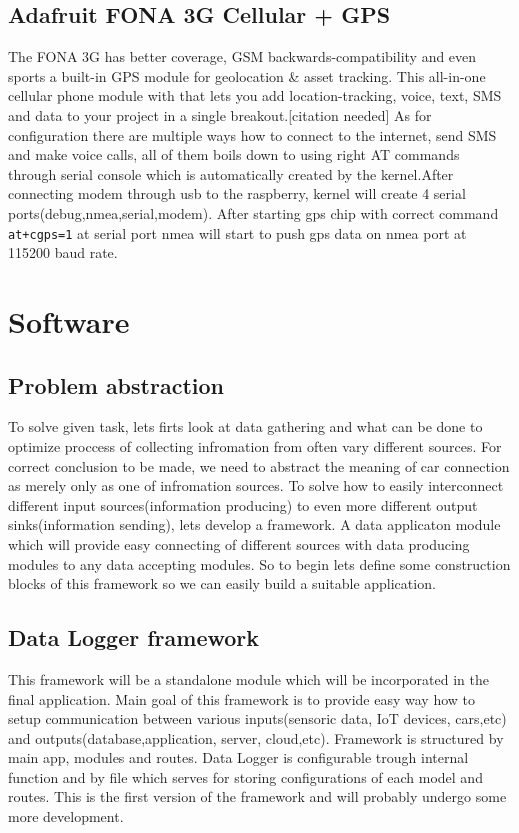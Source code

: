 \subsection{Adafruit FONA 3G Cellular + GPS} %
\label{sub:adafruit_fona_3g_cellular_gps_}
The FONA 3G has better coverage, GSM backwards-compatibility and even sports a built-in GPS module for geolocation & asset tracking. This all-in-one cellular phone module with that lets you add location-tracking, voice, text, SMS and data to your project in a single breakout.[citation needed] As for configuration there are multiple ways how to connect to the internet, send SMS and make voice calls, all of them boils down to using right AT commands through serial console which is automatically created by the kernel.After connecting modem through usb to the raspberry, kernel will create 4 serial ports(debug,nmea,serial,modem). After starting gps chip with correct command \verb|at+cgps=1| at serial port nmea will start to push gps data on nmea port at 115200 baud rate.
\newpage
\section{Software} %
\label{sec:software}
\subsection{Problem abstraction} %
\label{sub:problem_abstraction}
To solve given task, lets firts look at data gathering and what can be done to optimize proccess of collecting infromation from often vary different sources. For correct conclusion to be made, we need to abstract the meaning of car connection as merely only as one of infromation sources. To solve how to easily interconnect different input sources(information producing) to even more different output sinks(information sending), lets develop a framework. A data applicaton module which will provide easy connecting of different sources with data producing modules to any data accepting modules. So to begin lets define some construction blocks of this framework so we can easily build a suitable application.
\subsection{Data Logger framework} %
This framework will be a standalone module which will be incorporated in the final application. Main goal of this framework is to provide easy way how to setup communication between various inputs(sensoric data, IoT devices, cars,etc) and outputs(database,application, server, cloud,etc). Framework is structured by main app, modules and routes. Data Logger is configurable trough internal function and by file which serves for storing configurations of each model and routes. This is the first version of the framework and will probably undergo some more development.
